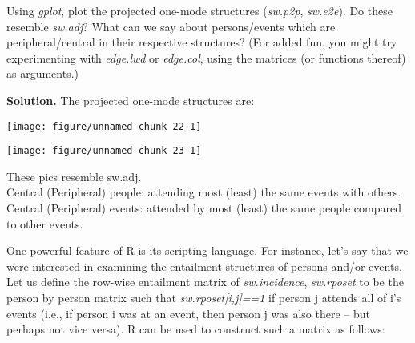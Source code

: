 \documentclass[11pt, oneside]{article}\usepackage[]{graphicx}\usepackage[]{color}
\makeatletter
\def\maxwidth{ %
  \ifdim\Gin@nat@width>\linewidth
    \linewidth
  \else
    \Gin@nat@width
  \fi
}
\newenvironment{knitrout}{}{} %
\newenvironment{solution}{\begin{trivlist} \item \textbf{Solution.}}{\end{trivlist}}
\newenvironment{prob}[2][Problem]{\begin{trivlist}
\item[\hskip \labelsep {\bfseries #1}\hskip \labelsep {\bfseries #2.}]}{\end{trivlist}}
\makeatother
\begin{document}
\begin{prob}{2}
\begin{enumerate}
\item Using \emph{gplot}, plot the projected one-mode structures (\emph{sw.p2p}, \emph{sw.e2e}). Do these resemble \emph{sw.adj}? What can we say about persons/events which are peripheral/central in their respective structures? (For added fun, you might try experimenting with \emph{edge.lwd} or \emph{edge.col}, using the matrices (or functions thereof) as arguments.)

\begin{solution}
The projected one-mode structures are:
\begin{center}
\begin{knitrout}
\color{fgcolor}

{\centering \texttt{[image: figure/unnamed-chunk-22-1]} 

}



\end{knitrout}
\begin{knitrout}
\color{fgcolor}

{\centering \texttt{[image: figure/unnamed-chunk-23-1]} 

}



\end{knitrout}
\end{center}
These pics resemble sw.adj.\\
Central (Peripheral) people: attending most (least) the same events with others.\\
Central (Peripheral) events: attended by most (least) the same people compared to other 
events.
\end{solution}


\item  One powerful feature of R is its scripting language. For instance, let's say that we were interested in examining the \underline{entailment structures} of persons and/or events. Let us define the row-wise entailment matrix of \emph{sw.incidence}, \emph{sw.rposet} to be the person by person matrix such that \emph{sw.rposet[i,j]==1} if person j attends all of i's events (i.e., if person i was at an event, then person j was also there -- but perhaps not vice versa). R can be used to construct such a matrix as follows:


\end{enumerate}
\end{prob}
\end{document}
